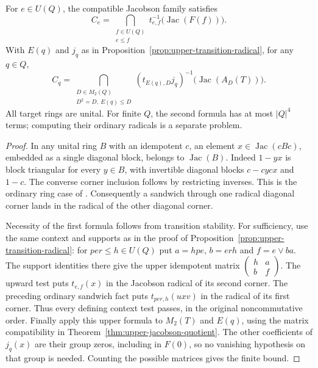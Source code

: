 \begin{corollary}
\label{cor:jacobson-transition-tests}
For $e\in U(Q)$, the compatible Jacobson family satisfies
\[
 C_e=\bigcap_{\substack{f\in U(Q)\\e\leq f}}
 t_{e,f}^{-1}\bigl(\operatorname{Jac}(F(f))\bigr).
\]
With $E(q)$ and $j_q$ as in
Proposition~\ref{prop:upper-transition-radical}, for any $q\in Q$,
\[
 C_q=\bigcap_{\substack{D\in M_2(Q)\\D^2=D,\ E(q)\leq D}}
 (t_{E(q),D}j_q)^{-1}\bigl(\operatorname{Jac}(A_D(T))\bigr).
\]
All target rings are unital. For finite $Q$, the second formula
has at most $|Q|^4$ terms; computing their ordinary radicals is
a separate problem.
\end{corollary}
\begin{proof}
In any unital ring $B$ with an idempotent $c$, an element
$x\in\operatorname{Jac}(cBc)$, embedded as a single diagonal
block, belongs to $\operatorname{Jac}(B)$. Indeed $1-yx$ is
block triangular for every $y\in B$, with invertible diagonal
blocks $c-cycx$ and $1-c$. The converse corner inclusion follows
by restricting inverses. This is the ordinary ring case of
\cite[Proposition~5.15, p.~36 of the preprint]{KatsovNamRadicals}.
Consequently a sandwich through one radical diagonal corner
lands in the radical of the other diagonal corner.

Necessity of the first formula follows from transition stability.
For sufficiency, use the same context and supports as in the proof
of Proposition~\ref{prop:upper-transition-radical}: for
$per\leq h\in U(Q)$ put
$a=hpe$, $b=erh$ and $f=e\vee ba$. The support identities there
give the upper idempotent matrix
$\left(\begin{smallmatrix}h&a\\b&f\end{smallmatrix}\right)$.
The upward test puts $t_{e,f}(x)$ in the Jacobson radical of its
second corner. The preceding ordinary sandwich fact puts
$t_{per,h}(uxv)$ in the radical of its first corner. Thus every
defining context test passes, in the original noncommutative order.
Finally apply this upper formula to $M_2(T)$ and $E(q)$, using
the matrix compatibility in
Theorem~\ref{thm:upper-jacobson-quotient}. The other coefficients
of $j_q(x)$ are their group zeros, including in $F(0)$, so no
vanishing hypothesis on that group is needed. Counting the
possible matrices gives the finite bound.
\end{proof}


